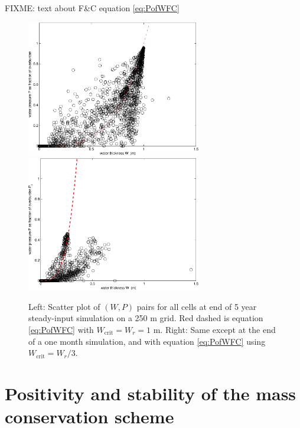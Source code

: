 \documentclass[11pt,final]{amsart}%
\begin{document}
FIXME:  text about F\&C equation \eqref{eq:PofWFC}

\begin{figure}[ht]
\includegraphics[width=3.0in,keepaspectratio=true]{isPofW-250m} \,
\includegraphics[width=3.0in,keepaspectratio=true]{isPofW-250m-month}
\caption{Left: Scatter plot of $(W,P)$ pairs for all cells at end of 5 year steady-input simulation on a 250 m grid.  Red dashed is equation \eqref{eq:PofWFC} with $W_{\text{crit}} = W_r = 1$ m.  Right: Same except at the end of a one month simulation, and with equation \eqref{eq:PofWFC} using $W_{\text{crit}} = W_r / 3$.}
\label{fig:isPofWnbreen}
\end{figure}


\clearpage\newpage

\small

\normalsize


\clearpage\newpage
\appendix

\section{Positivity and stability of the mass conservation scheme}
\end{document}
